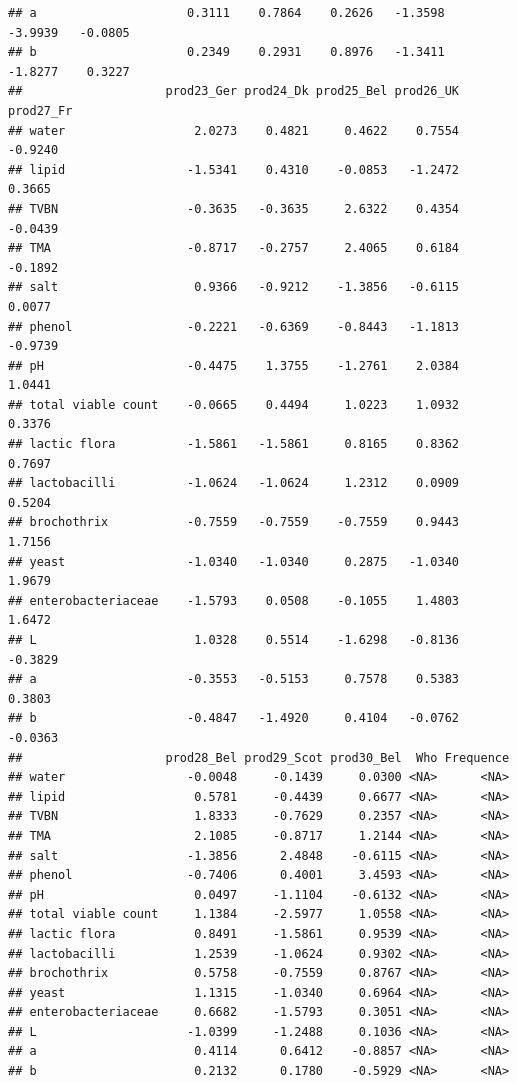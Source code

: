 \documentclass[
]{book}
\begin{document}
\begin{verbatim}
## a                     0.3111    0.7864    0.2626   -1.3598   -3.9939   -0.0805
## b                     0.2349    0.2931    0.8976   -1.3411   -1.8277    0.3227
##                    prod23_Ger prod24_Dk prod25_Bel prod26_UK prod27_Fr
## water                  2.0273    0.4821     0.4622    0.7554   -0.9240
## lipid                 -1.5341    0.4310    -0.0853   -1.2472    0.3665
## TVBN                  -0.3635   -0.3635     2.6322    0.4354   -0.0439
## TMA                   -0.8717   -0.2757     2.4065    0.6184   -0.1892
## salt                   0.9366   -0.9212    -1.3856   -0.6115    0.0077
## phenol                -0.2221   -0.6369    -0.8443   -1.1813   -0.9739
## pH                    -0.4475    1.3755    -1.2761    2.0384    1.0441
## total viable count    -0.0665    0.4494     1.0223    1.0932    0.3376
## lactic flora          -1.5861   -1.5861     0.8165    0.8362    0.7697
## lactobacilli          -1.0624   -1.0624     1.2312    0.0909    0.5204
## brochothrix           -0.7559   -0.7559    -0.7559    0.9443    1.7156
## yeast                 -1.0340   -1.0340     0.2875   -1.0340    1.9679
## enterobacteriaceae    -1.5793    0.0508    -0.1055    1.4803    1.6472
## L                      1.0328    0.5514    -1.6298   -0.8136   -0.3829
## a                     -0.3553   -0.5153     0.7578    0.5383    0.3803
## b                     -0.4847   -1.4920     0.4104   -0.0762   -0.0363
##                    prod28_Bel prod29_Scot prod30_Bel  Who Frequence
## water                 -0.0048     -0.1439     0.0300 <NA>      <NA>
## lipid                  0.5781     -0.4439     0.6677 <NA>      <NA>
## TVBN                   1.8333     -0.7629     0.2357 <NA>      <NA>
## TMA                    2.1085     -0.8717     1.2144 <NA>      <NA>
## salt                  -1.3856      2.4848    -0.6115 <NA>      <NA>
## phenol                -0.7406      0.4001     3.4593 <NA>      <NA>
## pH                     0.0497     -1.1104    -0.6132 <NA>      <NA>
## total viable count     1.1384     -2.5977     1.0558 <NA>      <NA>
## lactic flora           0.8491     -1.5861     0.9539 <NA>      <NA>
## lactobacilli           1.2539     -1.0624     0.9302 <NA>      <NA>
## brochothrix            0.5758     -0.7559     0.8767 <NA>      <NA>
## yeast                  1.1315     -1.0340     0.6964 <NA>      <NA>
## enterobacteriaceae     0.6682     -1.5793     0.3051 <NA>      <NA>
## L                     -1.0399     -1.2488     0.1036 <NA>      <NA>
## a                      0.4114      0.6412    -0.8857 <NA>      <NA>
## b                      0.2132      0.1780    -0.5929 <NA>      <NA>
\end{verbatim}
\end{document}

